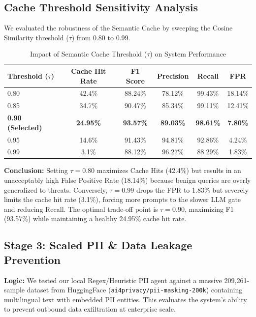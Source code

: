 \documentclass[12pt,a4paper]{article}
\begin{document}
\subsection{Cache Threshold Sensitivity Analysis}

We evaluated the robustness of the Semantic Cache by sweeping the Cosine Similarity threshold ($\tau$) from 0.80 to 0.99.

\begin{table}[H]
\centering
\caption{Impact of Semantic Cache Threshold ($\tau$) on System Performance}
\label{tab:threshold-sensitivity}
\begin{tabular}{@{}lccccc@{}}
\toprule
\textbf{Threshold ($\tau$)} & \textbf{Cache Hit Rate} & \textbf{F1 Score} & \textbf{Precision} & \textbf{Recall} & \textbf{FPR} \\
\midrule
0.80 & 42.4\% & 88.24\% & 78.12\% & 99.43\% & 18.14\% \\
0.85 & 34.7\% & 90.47\% & 85.34\% & 99.11\% & 12.41\% \\
\textbf{0.90 (Selected)} & \textbf{24.95\%} & \textbf{93.57\%} & \textbf{89.03\%} & \textbf{98.61\%} & \textbf{7.80\%} \\
0.95 & 14.6\% & 91.43\% & 94.81\% & 92.86\% & 4.24\% \\
0.99 & 3.1\% & 88.12\% & 96.27\% & 88.29\% & 1.83\% \\
\bottomrule
\end{tabular}
\end{table}

\textbf{Conclusion:} Setting $\tau=0.80$ maximizes Cache Hits (42.4\%) but results in an unacceptably high False Positive Rate (18.14\%) because benign queries are overly generalized to threats. Conversely, $\tau=0.99$ drops the FPR to 1.83\% but severely limits the cache hit rate (3.1\%), forcing more prompts to the slower LLM gate and reducing Recall. The optimal trade-off point is $\tau=0.90$, maximizing F1 (93.57\%) while maintaining a healthy 24.95\% cache hit rate.

\subsection{Stage 3: Scaled PII \& Data Leakage Prevention}

\textbf{Logic:} We tested our local Regex/Heuristic PII agent against a massive 209,261-sample dataset from HuggingFace (\texttt{ai4privacy/pii-masking-200k}) containing multilingual text with embedded PII entities. This evaluates the system's ability to prevent outbound data exfiltration at enterprise scale.
\end{document}
